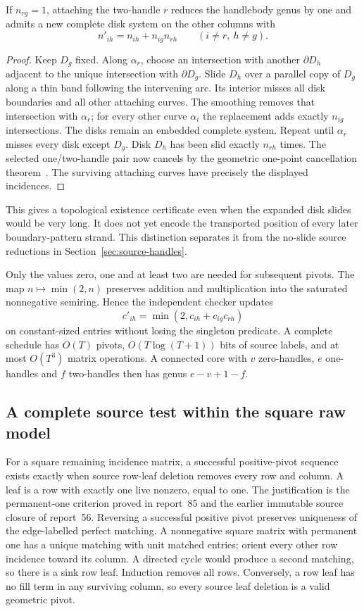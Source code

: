 \begin{lemma}
\label{marked-cut:pivot}
If $n_{rg}=1$, attaching the two-handle $r$ reduces the handlebody genus by
one and admits a new complete disk system on the other columns with
\[
 n'_{ih}=n_{ih}+n_{ig}n_{rh}\qquad(i\ne r,\ h\ne g).
\]
\end{lemma}
\begin{proof}
Keep $D_g$ fixed. Along $\alpha_r$, choose an intersection with another
$\partial D_h$ adjacent to the unique intersection with $\partial D_g$.
Slide $D_h$ over a parallel copy of $D_g$ along a thin band following the
intervening arc. Its interior misses all disk boundaries and all other
attaching curves. The smoothing removes that intersection with $\alpha_r$;
for every other curve $\alpha_i$ the replacement adds exactly $n_{ig}$
intersections. The disks remain an embedded complete system. Repeat until
$\alpha_r$ misses every disk except $D_g$. Disk $D_h$ has been slid exactly
$n_{rh}$ times. The selected one/two-handle pair now cancels by the geometric
one-point cancellation theorem~\cite[Lemma 10.3]{sadykov-cancellation}.
The surviving attaching curves have precisely the displayed incidences.
\end{proof}

This gives a topological existence certificate even when the expanded disk
slides would be very long. It does not yet encode the transported position
of every later boundary-pattern strand. This distinction separates it from
the no-slide source reductions in Section~\ref{sec:source-handles}.

Only the values zero, one and at least two are needed for subsequent pivots.
The map $n\mapsto\min(2,n)$ preserves addition and multiplication into the
saturated nonnegative semiring. Hence the independent checker updates
\[
 c'_{ih}=\min(2,c_{ih}+c_{ig}c_{rh})
\]
on constant-sized entries without losing the singleton predicate. A complete
schedule has $O(T)$ pivots, $O(T\log(T+1))$ bits of source labels, and at most
$O(T^3)$ matrix operations. A connected core with $v$ zero-handles, $e$
one-handles and $f$ two-handles then has genus $e-v+1-f$.

\subsection{A complete source test within the square raw model}

For a square remaining incidence matrix, a successful positive-pivot sequence
exists exactly when source row-leaf deletion removes every row and column.
A leaf is a row with exactly one live nonzero, equal to one. The justification
is the permanent-one criterion proved in report~85 and the earlier immutable
source closure of report~56. Reversing a successful positive pivot preserves
uniqueness of the edge-labelled perfect matching. A nonnegative square
matrix with permanent one has a unique matching with unit matched entries;
orient every other row incidence toward its column. A directed cycle would
produce a second matching, so there is a sink row leaf. Induction removes
all rows. Conversely, a row leaf has no fill term in any surviving column,
so every source leaf deletion is a valid geometric pivot.

